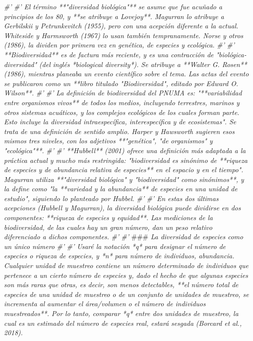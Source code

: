 \documentclass[11pt,]{article}
\newenvironment{Shaded}{\begin{snugshade}}{\end{snugshade}}
\newcommand{\CommentTok}[1]{\textcolor[rgb]{0.56,0.35,0.01}{\textit{#1}}}
\newcommand{\AlertTok}[1]{\textcolor[rgb]{0.94,0.16,0.16}{#1}}
\begin{document}
\begin{Shaded}
\begin{Highlighting}[]
{\CommentTok{#' }
\CommentTok{#' El término **"diversidad biológica"** se asume que fue acuñado a principios de los 80, y **se atribuye a Lovejoy**. Magurran lo atribuye a Gerbilskii y Petrunkevitch (1955), pero con una acepción diferente a la actual. Whiteside y Harmsworth (1967) lo usan también tempranamente. Norse y otros (1986), la dividen por primera vez en genética, de especies y ecológica.}
\CommentTok{#' }
\CommentTok{#' **Biodiversidad** es de factura más reciente, y es una contracción de "biológica-diversidad" (del inglés *biological diversity*). Se atribuye a **Walter G. Rosen** (1986), mientras planeaba un evento científico sobre el tema. Las actas del evento se publicaron como un **libro titulado "Biodiversidad", editado por Edward O. Wilson**.}
\CommentTok{#' }
\CommentTok{#' La definición de biodiversidad del PNUMA es: "**variabilidad entre organismos vivos** de todos los medios, incluyendo terrestres, marinos y otros sistemas acuáticos, y los complejos ecológicos de los cuales forman parte. Esto incluye la diversidad intraespecífica, interespecífica y de ecosistemas". Se trata de una definición de sentido amplio. Harper y Hawsworth sugieren esos mismos tres niveles, con los adjetivos **"genética", "de organismos" y "ecológica"**.}
\CommentTok{#' }
\CommentTok{#' **Hubbell** (2001) ofrece una definición más adaptada a la práctica actual y mucho más restringida: "biodiversidad es sinónimo de **riqueza de especies y de abundancia relativa de especies** en el espacio y en el tiempo". Magurran utiliza **"diversidad biológica" y "biodiversidad" como sinónimos**, y la define como "la **variedad y la abundancia** de especies en una unidad de estudio", siguiendo lo planteado por Hubbel.}
\CommentTok{#' }
\CommentTok{#' En estas dos últimas acepciones (Hubbell y Magurran), la diversidad biológica puede dividirse en dos componentes: **riqueza de especies y equidad**. Las mediciones de la biodiversidad, de las cuales hay un gran número, dan un peso relativo diferenciado a dichos componentes. }
\CommentTok{#' }
\CommentTok{#' }\AlertTok{###}\CommentTok{ La diversidad de especies como un único número}
\CommentTok{#' }
\CommentTok{#' Usaré la notación *q* para designar el número de especies o riqueza de especies, y *n* para número de individuos, abundancia. Cualquier unidad de muestreo contiene un número determinado de individuos que pertenece a un cierto número de especies y, dado el hecho de que algunas especies son más raras que otras, es decir, son menos detectables, **el número total de especies de una unidad de muestreo o de un conjunto de unidades de muestreo, se incrementa al aumentar el área/volumen o el número de individuos muestreados**. Por lo tanto, comparar *q* entre dos unidades de muestreo, la cual es un estimado del número de especies real, estará sesgada (Borcard et al., 2018).}
}
\end{Highlighting}
\end{Shaded}
\end{document}
